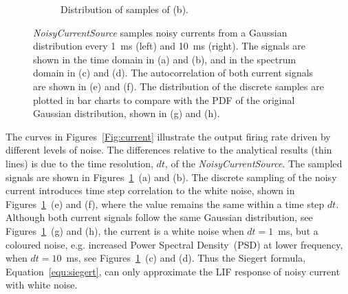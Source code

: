 \begin{figure}[tbp!]
\begin{subfigure}[t]{0.43\textwidth}
			\caption{Distribution of samples of (b).}
		\end{subfigure}
		\caption[\textit{NoisyCurrentSource} samples noisy currents from a Gaussian distribution.]{\textit{NoisyCurrentSource} samples noisy currents from a Gaussian distribution every 1~ms (left) and 10~ms (right). The signals are shown in the time domain in (a) and (b), and in the spectrum domain in (c) and (d). The autocorrelation of both current signals are shown in (e) and (f). The distribution of the discrete samples are plotted in bar charts to compare with the PDF of the original Gaussian distribution, shown in (g) and (h).}
		\label{Fig:lif_curr}
	\end{figure}
	
	The curves in Figures~\ref{Fig:current} illustrate the output firing rate driven by different levels of noise.
	The differences relative to the analytical results (thin lines) is due to the time resolution, $dt$, of the \textit{NoisyCurrentSource}.
	The sampled signals are shown in Figures~\ref{Fig:lif_curr}~(a) and (b).
	The discrete sampling of the noisy current introduces time step correlation to the white noise, shown in Figures~\ref{Fig:lif_curr}~(e) and (f), where the value remains the same within a time step $dt$.
	Although both current signals follow the same Gaussian distribution, see Figures~\ref{Fig:lif_curr}~(g) and (h), the current is a white noise when $dt=1$~ms, but a coloured noise, e.g. increased Power Spectral Density~(PSD) at lower frequency, when $dt=10$~ms, see Figures~\ref{Fig:lif_curr}~(c) and (d).
	Thus the Siegert formula, Equation~\ref{equ:siegert}, can only approximate the LIF response of noisy current with white noise.
